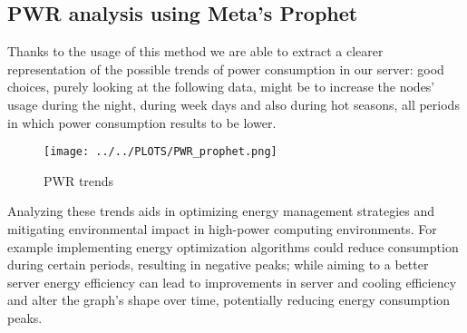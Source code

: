 \subsection{PWR analysis using Meta's Prophet}
Thanks to the usage of this method we are able to extract a clearer representation of the possible trends of power consumption in our server:
good choices, purely looking at the following data, might be to increase the nodes' usage during the night, during week days and also during hot seasons, all periods in which power consumption results to be lower. 

\vspace{-10pt}

\begin{figure}[H]
\centering
\texttt{[image: ../../PLOTS/PWR\_prophet.png]}
\caption{PWR trends}
\label{fig:PWR_prophet}
\end{figure}

\noindent
Analyzing these trends aids in optimizing energy management strategies and mitigating environmental impact in high-power computing environments.
For example implementing energy optimization algorithms could reduce consumption during certain periods, resulting in negative peaks;
while aiming to a better server energy efficiency can lead to improvements in server and cooling efficiency and alter the graph's shape over time, potentially reducing energy consumption peaks.
